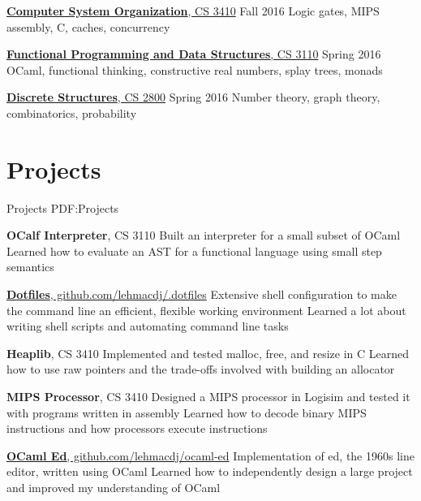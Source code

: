 \documentclass[letterpaper,10pt,oneside]{simpleresume}
\begin{document}
\begin{minipage}[t][0pt]{\linewidth}
\begin{body}
\href{https://www.cs.cornell.edu/courses/cs3410/2016fa/}
{\textbf{Computer System Organization}, CS 3410}
\hfill Fall 2016
\BulletItem%
Logic gates, MIPS assembly, C, caches, concurrency

\href{https://www.cs.cornell.edu/courses/cs3110/2016sp/}
{\textbf{Functional Programming and Data Structures}, CS 3110}
\hfill Spring 2016
\BulletItem%
OCaml, functional thinking, constructive real numbers, splay trees, monads

\href{https://www.cs.cornell.edu/courses/cs2800/2016sp/}
{\textbf{Discrete Structures}, CS 2800}
\hfill Spring 2016
\BulletItem%
Number theory, graph theory, combinatorics, probability

\section%
{Projects}
{Projects}
{PDF:Projects}

\textbf{OCalf Interpreter}, CS 3110
\BulletItem%
Built an interpreter for a small subset of OCaml
\BulletItem%
Learned how to evaluate an AST for a functional language using small step
semantics

\href{https://www.github.com/lehmacdj/.dotfiles}
{\textbf{Dotfiles}, github.com/lehmacdj/.dotfiles}
\BulletItem%
Extensive shell configuration to make the command line an efficient, flexible
working environment
\BulletItem%
Learned a lot about writing shell scripts and automating command line tasks

\textbf{Heaplib}, CS 3410
\BulletItem%
Implemented and tested malloc, free, and resize in C
\BulletItem%
Learned how to use raw pointers and the trade-offs involved with building
an allocator

\textbf{MIPS Processor}, CS 3410
\BulletItem%
Designed a MIPS processor in Logisim and tested it with programs written in
assembly
\BulletItem%
Learned how to decode binary MIPS instructions and how processors execute
instructions

\href{https://www.github.com/lehmacdj/ocaml-ed}
{\textbf{OCaml Ed}, github.com/lehmacdj/ocaml-ed}
\BulletItem%
Implementation of ed, the 1960s line editor, written using OCaml
\BulletItem%
Learned how to independently design a large project and improved my
understanding of OCaml



\end{body}
\end{minipage}
\end{document}
